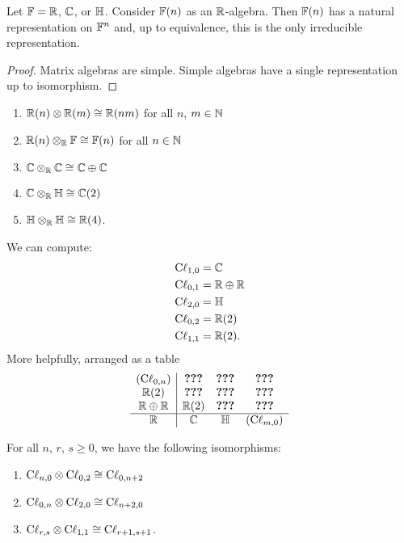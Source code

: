 \begin{lemma}
Let $\mathbb{F}=\mathbb{R}$, $\mathbb{C}$, or $\mathbb{H}$.
Consider $\mathbb{F}(n)$ as an $\mathbb{R}$-algebra.
Then $\mathbb{F}(n)$ has a natural representation on $\mathbb{F}^{n}$ and, up to
equivalence, this is the only irreducible representation.
\end{lemma}

\begin{proof}
Matrix algebras are simple. Simple algebras have a single representation
up to isomorphism.
\end{proof}

\begin{proposition}
\begin{enumerate}
\item $\mathbb{R}(n)\otimes\mathbb{R}(m)\cong\mathbb{R}(nm)$ for all $n$, $m\in\mathbb{N}$
\item $\mathbb{R}(n)\otimes_{\mathbb{R}}\mathbb{F}\cong\mathbb{F}(n)$ for all $n\in\mathbb{N}$
\item $\mathbb{C}\otimes_{\mathbb{R}}\mathbb{C}\cong\mathbb{C}\oplus\mathbb{C}$
\item $\mathbb{C}\otimes_{\mathbb{R}}\mathbb{H}\cong\mathbb{C}(2)$
\item $\mathbb{H}\otimes_{\mathbb{R}}\mathbb{H}\cong\mathbb{R}(4)$.
\end{enumerate}
\end{proposition}

We can compute:
\begin{subequations}
\begin{align}
\mathrm{C}\ell_{1,0} &= \mathbb{C}\\
\mathrm{C}\ell_{0,1} &= \mathbb{R}\oplus\mathbb{R}\\
\mathrm{C}\ell_{2,0} &= \mathbb{H}\\
\mathrm{C}\ell_{0,2} &= \mathbb{R}(2)\\
\mathrm{C}\ell_{1,1} &= \mathbb{R}(2).
\end{align}
\end{subequations}
More helpfully, arranged as a table
\begin{equation}
\begin{array}{c|ccc}
(\mathrm{C}\ell_{0,n})   & \hbox{\normalfont\bfseries???}   & \hbox{\normalfont\bfseries???} & \hbox{\normalfont\bfseries???}\\
  \mathbb{R}(2)     & \hbox{\normalfont\bfseries???}   & \hbox{\normalfont\bfseries???} & \hbox{\normalfont\bfseries???}\\
\mathbb{R}\oplus\mathbb{R} & \mathbb{R}(2) & \hbox{\normalfont\bfseries???} & \hbox{\normalfont\bfseries???}\\\hline
\mathbb{R}          &  \mathbb{C}   &  \mathbb{H} & (\mathrm{C}\ell_{m,0})
\end{array}
\end{equation}

\begin{theorem}
For all $n$, $r$, $s\geq0$, we have the following isomorphisms:
\begin{enumerate}
\item $\mathrm{C}\ell_{n,0}\otimes\mathrm{C}\ell_{0,2}\cong\mathrm{C}\ell_{0,n+2}$
\item $\mathrm{C}\ell_{0,n}\otimes\mathrm{C}\ell_{2,0}\cong\mathrm{C}\ell_{n+2,0}$
\item $\mathrm{C}\ell_{r,s}\otimes\mathrm{C}\ell_{1,1}\cong\mathrm{C}\ell_{r+1,s+1}$.
\end{enumerate}
\end{theorem}

